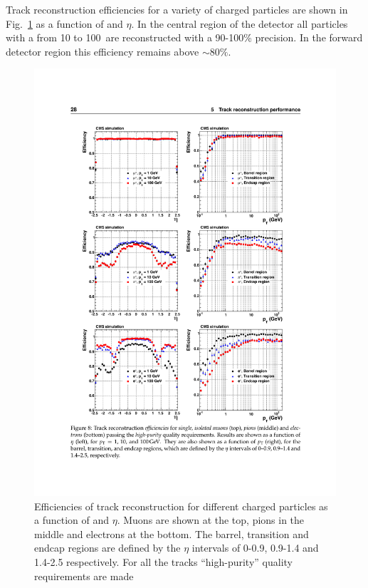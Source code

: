 Track reconstruction efficiencies for a variety of charged particles
are shown in Fig.~\ref{fig:tracks_reco} as a function of \pt and
$\eta$. In the central region of the detector all particles with a \pt
from 10 to 100~\gev are reconstructed with a 90-100\% precision. In the
forward detector region this efficiency remains above $\sim80\%$.

\begin{figure}
\begin{center}
\includegraphics[width=0.8\linewidth]{figs/reconstruction/trackerPerformance} \end{center}
\caption{Efficiencies of track reconstruction for different charged
particles as a function of \pt and $\eta$. Muons are shown at the top,
pions in the middle and electrons at the bottom. The barrel,
transition and endcap regions are defined by the $\eta$ intervals of
0-0.9, 0.9-1.4 and 1.4-2.5 respectively.  For all the tracks
``high-purity'' quality requirements are made
\cite{Chatrchyan:2014fea}}
\label{fig:tracks_reco} \end{figure}

